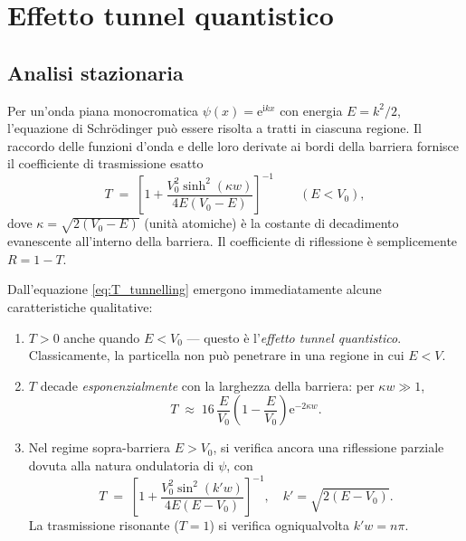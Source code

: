 \documentclass[12pt, a4paper]{article}
\newcommand{\ii}{\mathrm{i}}          %
\newcommand{\ee}{\mathrm{e}}          %
\begin{document}
\section{Effetto tunnel quantistico}
\label{sec:tunnelling}

\subsection{Analisi stazionaria}

Per un'onda piana monocromatica $\psi(x) = \ee^{\ii kx}$ con energia
$E = k^2/2$, l'equazione di Schr\"{o}dinger può essere risolta a tratti
in ciascuna regione. Il raccordo delle funzioni d'onda e delle loro
derivate ai bordi della barriera fornisce il coefficiente di trasmissione
esatto \cite{Griffiths2018}
\begin{equation}
  T \;=\; \left[1 + \frac{V_0^2\sinh^2(\kappa w)}{4E(V_0-E)}\right]^{-1}
  \qquad (E < V_0),
  \label{eq:T_tunnelling}
\end{equation}
dove $\kappa = \sqrt{2(V_0-E)}$ (unità atomiche) è la costante di decadimento
evanescente all'interno della barriera. Il coefficiente di riflessione è
semplicemente $R = 1 - T$.

Dall'equazione \eqref{eq:T_tunnelling} emergono immediatamente alcune
caratteristiche qualitative:
\begin{enumerate}
  \item $T > 0$ anche quando $E < V_0$ — questo è l'\emph{effetto tunnel quantistico}.
        Classicamente, la particella non può penetrare in una regione in cui $E < V$.
  \item $T$ decade \emph{esponenzialmente} con la larghezza della barriera:
        per $\kappa w \gg 1$,
        \begin{equation}
          T \;\approx\; 16\,\frac{E}{V_0}\!\left(1 - \frac{E}{V_0}\right)
          \ee^{-2\kappa w}.
        \end{equation}
  \item Nel regime sopra-barriera $E > V_0$, si verifica ancora una riflessione
        parziale dovuta alla natura ondulatoria di $\psi$, con
        \begin{equation}
          T \;=\; \left[1 + \frac{V_0^2\sin^2(k' w)}{4E(E-V_0)}\right]^{-1},
          \quad k' = \sqrt{2(E-V_0)}.
        \end{equation}
        La trasmissione risonante ($T = 1$) si verifica ogniqualvolta $k'w = n\pi$.
\end{enumerate}
\end{document}
